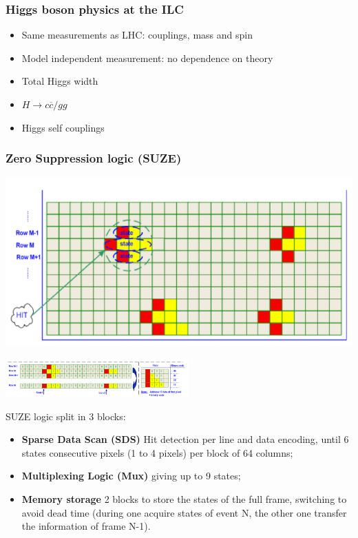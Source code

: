 \documentclass{beamer}
\newcommand{\grille}{
    \begin{tikzpicture}[overlay,remember picture]
        \begin{scope}[shift={(current page.south west)}]
            \draw[gray!50] (0,0) grid[step=2mm] (current page.north east);
            \draw[red!50] (0,0) grid[step=1cm] (current page.north east);
            \draw (0.2,1) node {1};
            \draw (0.2,2) node {2};
            \draw (0.2,3) node {3};
            \draw (0.2,4) node {4};
            \draw (0.2,5) node {5};
            \draw (0.2,6) node {6};
            \draw (0.2,7) node {7};
            \draw (0.2,8) node {8};
            \draw (0.2,9) node {9};
            \draw (1,0.5) node {1};
            \draw (2,0.5) node {2};
            \draw (3,0.5) node {3};
            \draw (4,0.5) node {4};
            \draw (5,0.5) node {5};
            \draw (6,0.5) node {6};
            \draw (7,0.5) node {7};
            \draw (8,0.5) node {8};
            \draw (9,0.5) node {9};
            \draw (10,0.5) node {10};
            \draw (11,0.5) node {11};
            \draw (12,0.5) node {12};
        \end{scope}
    \end{tikzpicture}
}
\begin{document}
  \begin{frame}[plain]
    \frametitle{Higgs boson physics at the ILC}

    \begin{itemize}
      \item Same measurements as LHC: couplings, mass and spin
      \item Model independent measurement: no dependence on theory
      \item Total Higgs width
      \item $H \rightarrow c\overline{c}/gg$
      \item Higgs self couplings
    \end{itemize}
  \end{frame}

  \begin{frame}[plain, label=suze]
    \frametitle{Zero Suppression logic (SUZE)}

    \vspace{-0.4cm}
    \begin{center}
        \includegraphics[width = 7 cm]{Pictures/suze_hitDetection.png}

        \includegraphics[width = 7cm]{Pictures/suze_hit2.png}
    \end{center}

    \vspace{-0.3cm}
    \scriptsize

    SUZE logic split in 3 blocks:
    \begin{itemize}
        \item \textbf{Sparse Data Scan (SDS)} Hit detection per line and data encoding, until 6 states consecutive pixels (1 to 4 pixels) per block of 64 columns;
        \item \textbf{Multiplexing Logic (Mux)} giving up to 9 states;
        \item \textbf{Memory storage} 2 blocks to store the states of the full frame, switching to avoid dead time (during one acquire states of event N, the other one transfer the information of frame N-1).
    \end{itemize}

  \end{frame}
\end{document}
